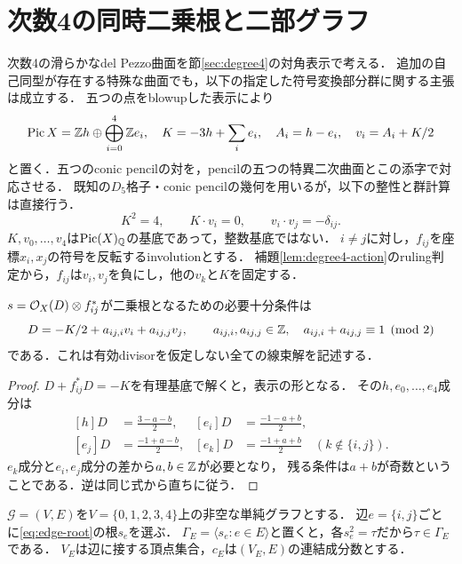 \section{次数4の同時二乗根と二部グラフ}
\label{sec:root-graphs}
次数4の滑らかなdel Pezzo曲面を節\ref{sec:degree4}の対角表示で考える．
追加の自己同型が存在する特殊な曲面でも，以下の指定した符号変換部分群に関する主張は成立する．
五つの点をblowupした表示により
\[
 \operatorname{Pic} X=\mathbb Z h\oplus\bigoplus_{i=0}^4\mathbb Z e_i,\quad
 K=-3h+\sum_i e_i,\quad A_i=h-e_i,\quad v_i=A_i+K/2
\]
と置く．五つのconic pencilの対を，pencilの五つの特異二次曲面とこの添字で対応させる．
既知の$D_5$格子・conic pencilの幾何\cite[\S2]{HKT}を用いるが，以下の整性と群計算は直接行う．
\[
 K^2=4,\qquad K\cdot v_i=0,\qquad v_i\cdot v_j=-\delta_{ij}.
\]
$K,v_0,\ldots,v_4$は$\operatorname{Pic}(X)_\mathbb Q$の基底であって，整数基底ではない．
$i\ne j$に対し，$f_{ij}$を座標$x_i,x_j$の符号を反転するinvolutionとする．
補題\ref{lem:degree4-action}のruling判定から，$f_{ij}$は$v_i,v_j$を負にし，他の$v_k$と$K$を固定する．

\begin{lemma}[全線束解の整性]\label{lem:graph-norm}
$s=\mathcal O_X(D)\otimes f_{ij}^*$が二乗根となるための必要十分条件は
\begin{equation}\label{eq:edge-root}
 D=-K/2+a_{ij,i}v_i+a_{ij,j}v_j,\qquad
 a_{ij,i},a_{ij,j}\in\mathbb Z,\quad a_{ij,i}+a_{ij,j}\equiv1\pmod2
\end{equation}
である．これは有効divisorを仮定しない全ての線束解を記述する．
\end{lemma}
\begin{proof}
$D+f_{ij}^*D=-K$を有理基底で解くと，表示の形となる．
その$h,e_0,\ldots,e_4$成分は
\[
 \begin{aligned}
 [h]D&=\frac{3-a-b}{2},&
 [e_i]D&=\frac{-1-a+b}{2},\\
 [e_j]D&=\frac{-1+a-b}{2},&
 [e_k]D&=\frac{-1+a+b}{2}\quad(k\notin\{i,j\}).
 \end{aligned}
\]
$e_k$成分と$e_i,e_j$成分の差から$a,b\in\mathbb Z$が必要となり，
残る条件は$a+b$が奇数ということである．逆は同じ式から直ちに従う．
\end{proof}

$\mathcal G=(V,E)$を$V=\{0,1,2,3,4\}$上の非空な単純グラフとする．
辺$e=\{i,j\}$ごとに\eqref{eq:edge-root}の根$s_e$を選ぶ．
$\Gamma_E=\langle s_e:e\in E\rangle$と置くと，各$s_e^2=\tau$だから$\tau\in\Gamma_E$である．
$V_E$は辺に接する頂点集合，$c_E$は$(V_E,E)$の連結成分数とする．

